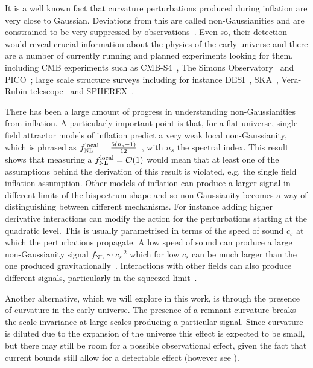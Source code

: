 \documentclass[a4paper,11pt]{article}
\numberwithin{equation}{section}
\numberwithin{equation}{section}
\begin{document}
It is a well known fact that curvature perturbations produced during inflation are very close to Gaussian. Deviations from this are called non-Gaussianities and are constrained to be very suppressed by observations~\cite{Planck:2019kim}.  Even so, their detection would reveal crucial information about the physics of the early universe and there are a number of currently running and planned experiments looking for them, including CMB experiments such as CMB-S4~\cite{CMB-S4:2016ple}, The Simons Observatory~\cite{SimonsObservatory:2018koc} and PICO~\cite{Alvarez:2019rhd}; large scale structure surveys including for instance DESI~\cite{Font-Ribera:2013rwa}, SKA~\cite{Maartens:2015mra}, Vera-Rubin telescope~\cite{LSSTScience:2009jmu} and SPHEREX~\cite{Dore:2014cca}.

There has been a large amount of progress in understanding non-Gaussianities from inflation. A particularly important point is that, for a flat universe, single field  attractor models of inflation predict a very weak local non-Gaussianity, which is phrased  as  $f_{\rm NL}^{\rm local} = \frac{5(n_s-1)}{12}$~\cite{Maldacena:2002vr}, with $n_s$ the spectral index. This result shows that measuring a $f_{\rm NL}^{\rm local} = \mathcal{O}(1)$ would mean that at least one of the assumptions behind the derivation of this result is violated, e.g. the single field inflation assumption. Other models of inflation can produce a larger signal  in different limits of the bispectrum shape and so non-Gaussianity becomes a way of distinguishing between different  mechanisms. For instance adding higher derivative interactions can modify the action for the perturbations starting at the quadratic level. This is usually parametrised in terms of the speed of sound $c_s$ at which the perturbations propagate. A low speed of sound can produce a large non-Gaussianity signal $f_{\mathrm{NL}}\sim c_s^{-2}$ which for low $c_s$ can be much larger than the one produced gravitationally~\cite{Chen:2006nt,Cheung:2007st}. Interactions with other fields can also produce different signals, particularly in the squeezed limit~\cite{Sasaki:2006kq,Chen:2009zp,Arkani-Hamed:2015bza}. 
 
Another alternative, which we will explore in this work, is through the presence of curvature in the early universe. The presence of a remnant curvature breaks the scale invariance at large scales producing a particular signal. Since curvature is diluted due to the expansion of the universe this effect is expected to be small, but there may still be room for a possible observational effect, given the fact that current bounds still allow for a detectable effect \cite{Handley:2019tkm,DiValentino:2020hov} (however see \cite{Efstathiou:2020wem}).
 
\end{document}
